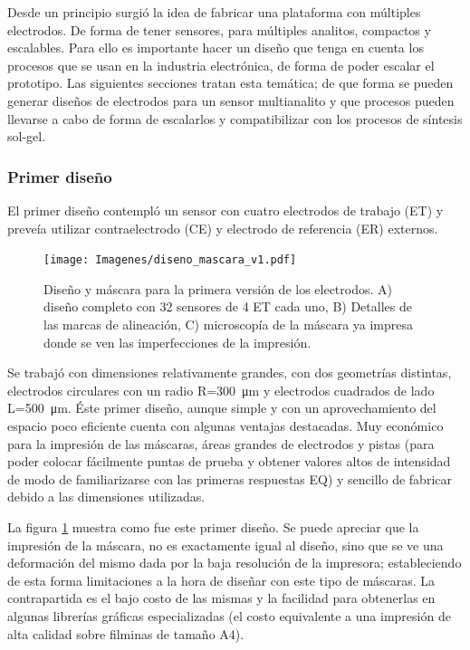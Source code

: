 			 Desde un principio surgió la idea de fabricar una plataforma con múltiples electrodos. De forma de tener sensores, para múltiples analitos, compactos y escalables. Para ello es importante hacer un diseño que tenga en cuenta los procesos que se usan en la industria electrónica, de forma de poder escalar el prototipo. Las siguientes secciones tratan esta temática; de que forma se pueden generar diseños de electrodos para un sensor multianalito y que procesos pueden llevarse a cabo de forma de escalarlos y compatibilizar con los procesos de síntesis sol-gel.

		 \subsubsection{Primer diseño}

		     El primer diseño contempló un sensor con cuatro electrodos de trabajo (ET) y preveía utilizar contraelectrodo (CE) y electrodo de referencia (ER) externos. 

		    	\begin{figure}[th!]
		 	       	\texttt{[image: Imagenes/diseno\_mascara\_v1.pdf]}
 		       		\caption[Primer diseño y máscara de los sensores]{Diseño y máscara para la primera versión de los electrodos. A) diseño completo con 32 sensores de 4 ET cada uno, B) Detalles de las marcas de alineación, C) microscopía de la máscara ya impresa donde se ven las imperfecciones de la impresión.}
 		         	\label{fig:diseno_mascara_v1}
 		     		\end{figure}
 		 	 \pagebreak
 		     		
		      Se trabajó con dimensiones relativamente grandes, con dos geometrías distintas, electrodos circulares con un radio R=\SI{300}{\um} y electrodos cuadrados de lado L=\SI{500}{\um}. Éste primer diseño, aunque simple y con un aprovechamiento del espacio poco eficiente cuenta con algunas ventajas destacadas. Muy económico para la impresión de las máscaras, áreas grandes de electrodos y pistas (para poder colocar fácilmente puntas de prueba y obtener valores altos de intensidad de modo de familiarizarse con las primeras respuestas EQ) y sencillo de fabricar debido a las dimensiones utilizadas.
		
		      La figura \ref{fig:diseno_mascara_v1} muestra como fue este primer diseño. Se puede apreciar que la impresión de la máscara, no es exactamente igual al diseño, sino que se ve una deformación del mismo dada por la baja resolución de la impresora; estableciendo de esta forma limitaciones a la hora de diseñar con este tipo de máscaras. La contrapartida es el bajo costo de las mismas y la facilidad para obtenerlas en algunas librerías gráficas especializadas (el costo equivalente a una impresión de alta calidad sobre filminas de tamaño A4).
		
